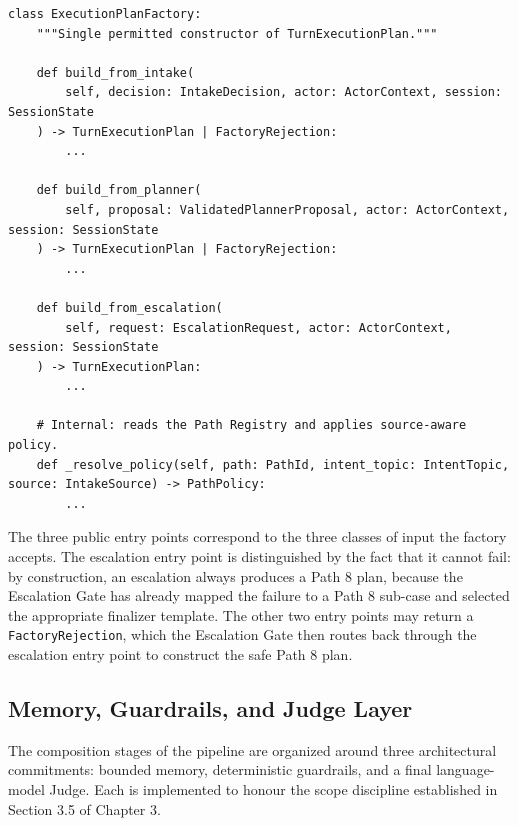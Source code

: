 \begin{lstlisting}[caption={Public surface of the ExecutionPlanFactory (illustrative).}, label={lst:factory_signature}, basicstyle=\ttfamily\small, frame=single, breaklines=true]
class ExecutionPlanFactory:
    """Single permitted constructor of TurnExecutionPlan."""

    def build_from_intake(
        self, decision: IntakeDecision, actor: ActorContext, session: SessionState
    ) -> TurnExecutionPlan | FactoryRejection:
        ...

    def build_from_planner(
        self, proposal: ValidatedPlannerProposal, actor: ActorContext, session: SessionState
    ) -> TurnExecutionPlan | FactoryRejection:
        ...

    def build_from_escalation(
        self, request: EscalationRequest, actor: ActorContext, session: SessionState
    ) -> TurnExecutionPlan:
        ...

    # Internal: reads the Path Registry and applies source-aware policy.
    def _resolve_policy(self, path: PathId, intent_topic: IntentTopic, source: IntakeSource) -> PathPolicy:
        ...
\end{lstlisting}

The three public entry points correspond to the three classes of input the factory accepts. The escalation entry point is distinguished by the fact that it cannot fail: by construction, an escalation always produces a Path 8 plan, because the Escalation Gate has already mapped the failure to a Path 8 sub-case and selected the appropriate finalizer template. The other two entry points may return a \texttt{FactoryRejection}, which the Escalation Gate then routes back through the escalation entry point to construct the safe Path 8 plan.

\subsection{Memory, Guardrails, and Judge Layer}
The composition stages of the pipeline are organized around three architectural commitments: bounded memory, deterministic guardrails, and a final language-model Judge. Each is implemented to honour the scope discipline established in Section 3.5 of Chapter 3.

